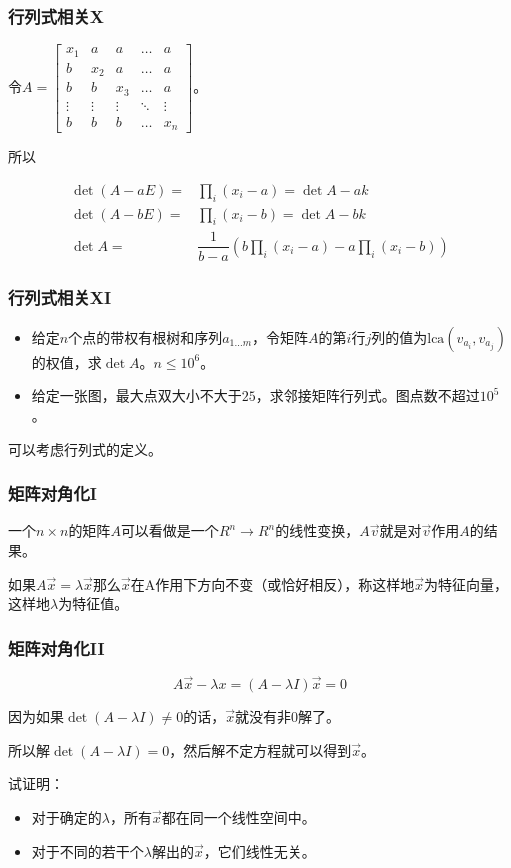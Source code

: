 \documentclass[10pt]{beamer}
\begin{document}
	\begin{frame}
		\frametitle{行列式相关X}
	
		令$A=\begin{bmatrix}x_1&a&a&\dots&a\\b&x_2&a&\dots&a\\b&b&x_3&\dots&a\\\vdots&\vdots&\vdots&\ddots&\vdots\\b&b&b&\dots&x_n\end{bmatrix}$。

		所以
		
		$$
		\begin{aligned}
			\det (A-aE)=&\prod_i(x_i-a)=\det A-ak\\
			\det (A-bE)=&\prod_i(x_i-b)=\det A-bk\\
			\det A=&\dfrac{1}{b-a}(b\prod_i(x_i-a)-a\prod_i(x_i-b))
		\end{aligned}
		$$
	
	\end{frame}
	\begin{frame}
		\frametitle{行列式相关XI}
	
		\begin{itemize}
			\item 给定$n$个点的带权有根树和序列$a_{1\dots m}$，令矩阵$A$的第$i$行$j$列的值为$\mathrm{lca}(v_{a_i},v_{a_j})$的权值，求$\det A$。$n\le 10^6$。
			\item 给定一张图，最大点双大小不大于$25$，求邻接矩阵行列式。图点数不超过$10^5$。
		\end{itemize}


		可以考虑行列式的定义。
	
	\end{frame}
	\begin{frame}
		\frametitle{矩阵对角化I}
	
		一个$n\times n$的矩阵$A$可以看做是一个$R^n\rightarrow R^n$的线性变换，$A\vec v$就是对$\vec v$作用$A$的结果。

		如果$A\vec x=\lambda \vec x$那么$\vec x$在A作用下方向不变（或恰好相反），称这样地$\vec x$为特征向量，这样地$\lambda$为特征值。
	
	\end{frame}
	\begin{frame}
		\frametitle{矩阵对角化II}
	
		$$
		A\vec x-\lambda x=(A-\lambda I)\vec x=0
		$$

		因为如果$\det(A-\lambda I)\not =0$的话，$\vec x$就没有非$0$解了。

		所以解$\det(A-\lambda I)=0$，然后解不定方程就可以得到$\vec x$。

		试证明：

		\begin{itemize}
			\item 对于确定的$\lambda$，所有$\vec x$都在同一个线性空间中。
			\item 对于不同的若干个$\lambda$解出的$\vec x$，它们线性无关。
		\end{itemize}
	
	\end{frame}
\end{document}

